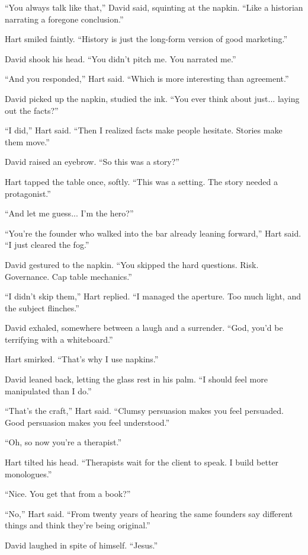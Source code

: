 “You always talk like that,” David said, squinting at the napkin. “Like a historian narrating a foregone conclusion.”

Hart smiled faintly. “History is just the long-form version of good marketing.”

David shook his head. “You didn’t pitch me. You narrated me.”

“And you responded,” Hart said. “Which is more interesting than agreement.”

David picked up the napkin, studied the ink. “You ever think about just... laying out the facts?”

“I did,” Hart said. “Then I realized facts make people hesitate. Stories make them move.”

David raised an eyebrow. “So this was a story?”

Hart tapped the table once, softly. “This was a setting. The story needed a protagonist.”

“And let me guess... I’m the hero?”

“You’re the founder who walked into the bar already leaning forward,” Hart said. “I just cleared the fog.”

David gestured to the napkin. “You skipped the hard questions. Risk. Governance. Cap table mechanics.”

“I didn’t skip them,” Hart replied. “I managed the aperture. Too much light, and the subject flinches.”

David exhaled, somewhere between a laugh and a surrender. “God, you’d be terrifying with a whiteboard.”

Hart smirked. “That’s why I use napkins.”

\medskip

David leaned back, letting the glass rest in his palm. “I should feel more manipulated than I do.”

“That’s the craft,” Hart said. “Clumsy persuasion makes you feel persuaded. Good persuasion makes you feel understood.”

“Oh, so now you’re a therapist.”

Hart tilted his head. “Therapists wait for the client to speak. I build better monologues.”

“Nice. You get that from a book?”

“No,” Hart said. “From twenty years of hearing the same founders say different things and think they’re being original.”

David laughed in spite of himself. “Jesus.”

